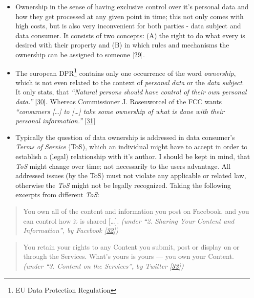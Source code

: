 \documentclass[12pt,english,a4paper,titlepage,cleardoublepage=empty,dottedtoc]{report}
\begin{document}
\begin{itemize}
\item
  Ownership in the sense of having exclusive control over it's personal
  data and how they get processed at any given point in time; this not
  only comes with high costs, but is also very inconvenient for both
  parties - data subject and data consumer. It consists of two
  \protect\hypertarget{def-ownership}{}{concepts}: (A) the right to do
  what every is desired with their property and (B) in which rules and
  mechanisms the ownership can be assigned to someone
  {[}\protect\hyperlink{ref-book_1987_private-ownership_definition}{29}{]}.
\item
  The european DPR\footnote{EU Data Protection Regulation} contains only
  one occurrence of the word \emph{ownership}, which is not even related
  to the context of \emph{personal data} or the \emph{data subject}. It
  only stats, that \emph{``Natural persons should have control of their
  own personal data.''}
  {[}\protect\hyperlink{ref-regulation_2016_eu_general-data-protection-regulation_ownership}{30}{]}.
  Whereas Commissioner J. Rosenworcel of the FCC wants \emph{``consumers
  {[}\ldots{}{]} to {[}\ldots{}{]} take some ownership of what is done
  with their personal information.''}
  {[}\protect\hyperlink{ref-rules_2016_fcc_to-protect-broadband-consumer-privacy_ownership}{31}{]}
\item
  Typically the question of data ownership is addressed in data
  consumer's \emph{Terms of Service} (ToS), which an individual might
  have to accept in order to establish a (legal) relationship with it's
  author. I should be kept in mind, that \emph{ToS} might change over
  time; not necessarily to the users advantage. All addressed issues (by
  the ToS) must not violate any applicable or related law, otherwise the
  \emph{ToS} might not be legally recognized. Taking the following
  excerpts from different \emph{ToS}:
\end{itemize}

\begin{quote}
You own all of the content and information you post on Facebook, and you
can control how it is shared {[}\ldots{}{]}. \emph{(under ``2. Sharing
Your Content and Information'', by Facebook
{[}\protect\hyperlink{ref-web_2016_facebook_terms-of-service}{32}{]})}
\end{quote}

\begin{quote}
You retain your rights to any Content you submit, post or display on or
through the Services. What's yours is yours --- you own your Content.
\emph{(under ``3. Content on the Services'', by Twitter
{[}\protect\hyperlink{ref-web_2016_twitter_terms-of-service}{33}{]})}
\end{quote}
\end{document}
